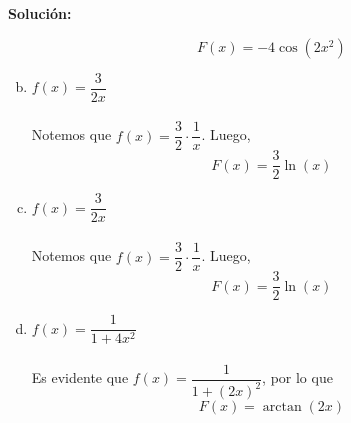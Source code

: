\documentclass[12pt]{article}
\newenvironment{solucion}
{\begin{mdframed}[backgroundcolor=black!10]
		{\bf Solución:}\\
	}
	{
	\end{mdframed}
}
\newenvironment{preguntas}
{\begin{enumerate}\itemsep12pt
	}
	{
	\end{enumerate}
}
\begin{document}
\begin{preguntas}
\begin{solucion}
\begin{enumerate}[a)]
$$F(x) = -4\cos(2x^2)$$
\item $f(x) = \dfrac{3}{2x}$\\
\\
Notemos que $f(x) = \dfrac{3}{2} \cdot \dfrac{1}{x}$. Luego,
$$F(x) = \dfrac{3}{2} \ln(x)$$
\item $f(x) = \dfrac{3}{2x}$\\
\\
Notemos que $f(x) = \dfrac{3}{2} \cdot \dfrac{1}{x}$. Luego,
$$F(x) = \dfrac{3}{2} \ln(x)$$
\item $f(x) = \dfrac{1}{1+4x^2}$\\
\\
Es evidente que $f(x)= \dfrac{1}{1+(2x)^2}$, por lo que
$$F(x) = \arctan(2x)$$
\end{enumerate}
\end{solucion}
\end{preguntas}
\end{document}
